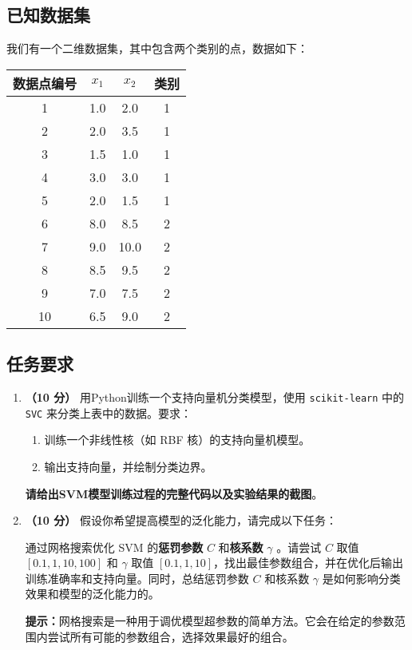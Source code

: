 \documentclass[8pt]{article}
\begin{document}
\subsection*{已知数据集}

我们有一个二维数据集，其中包含两个类别的点，数据如下：

\begin{table}[h]
    \centering
    \begin{tabular}{|c|c|c|c|}
        \hline
        数据点编号 & \(x_1\) & \(x_2\) & 类别 \\
        \hline
        1 & 1.0 & 2.0 & 1 \\
        2 & 2.0 & 3.5 & 1 \\
        3 & 1.5 & 1.0 & 1 \\
        4 & 3.0 & 3.0 & 1 \\
        5 & 2.0 & 1.5 & 1 \\
        6 & 8.0 & 8.5 & 2 \\
        7 & 9.0 & 10.0 & 2 \\
        8 & 8.5 & 9.5 & 2 \\
        9 & 7.0 & 7.5 & 2 \\
        10 & 6.5 & 9.0 & 2 \\
        \hline
    \end{tabular}
\end{table}

\subsection*{任务要求}

\begin{enumerate}
    \item \textbf{（10 分）} 用Python训练一个支持向量机分类模型，使用 \texttt{scikit-learn} 中的 \texttt{SVC} 来分类上表中的数据。要求：
    \begin{enumerate}
        \item 训练一个非线性核（如 RBF 核）的支持向量机模型。
        \item 输出支持向量，并绘制分类边界。
    \end{enumerate}

    \textbf{请给出SVM模型训练过程的完整代码以及实验结果的截图}。

    \item \textbf{（10 分）} 假设你希望提高模型的泛化能力，请完成以下任务：

    通过网格搜索优化 SVM 的\textbf{惩罚参数} \(C\) 和\textbf{核系数} \( \gamma \) 。请尝试 \( C \) 取值 \([0.1, 1, 10, 100]\) 和 \( \gamma \) 取值 \([0.1, 1, 10]\)，找出最佳参数组合，并在优化后输出训练准确率和支持向量。同时，总结惩罚参数 \(C\) 和核系数 \( \gamma \) 是如何影响分类效果和模型的泛化能力的。

    \textbf{提示：}网格搜索是一种用于调优模型超参数的简单方法。它会在给定的参数范围内尝试所有可能的参数组合，选择效果最好的组合。
\end{enumerate}
\end{document}
